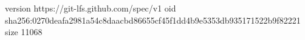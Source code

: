 version https://git-lfs.github.com/spec/v1
oid sha256:0270deafa2981a54c8daacbd86655cf45f1dd4b9e5353db935171522b9f82221
size 11068
